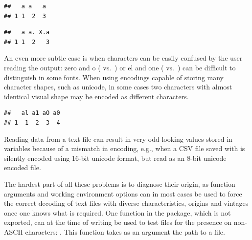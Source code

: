 \documentclass[krantz2]{krantz}\usepackage{knitr}
\begin{document}
\begin{explainbox}
\begin{knitrout}\footnotesize
{}\color{fgcolor}\begin{kframe}
\begin{alltt}
\hlstd{(} \hlstd{=} \hlstd{,}  \hlstd{=} \hlstd{,}  \hlstd{=} \hlstd{,}  \hlstd{=} \hlstd{)}
\end{alltt}
\begin{verbatim}
##   a a   a
## 1 1  2  3
\end{verbatim}
\begin{alltt}
\hlstd{(} \hlstd{=} \hlstd{,}  \hlstd{=} \hlstd{,}  \hlstd{=} \hlstd{)}
\end{alltt}
\begin{verbatim}
##   a a. X.a
## 1 1  2   3
\end{verbatim}
\end{kframe}
\end{knitrout}

An even more subtle case is when characters can be easily confused by the user reading the output: zero and o ( vs.\ ) or el and one ( vs.\ ) can be difficult to distinguish in some fonts. When using encodings capable of storing many character shapes, such as unicode, in some cases two characters with almost identical visual shape may be encoded as different characters.

\begin{knitrout}\footnotesize
{}\color{fgcolor}\begin{kframe}
\begin{alltt}
\hlstd{(} \hlstd{=} \hlstd{,}  \hlstd{=} \hlstd{,}  \hlstd{=} \hlstd{,}  \hlstd{=} \hlstd{)}
\end{alltt}
\begin{verbatim}
##   al a1 aO a0
## 1  1  2  3  4
\end{verbatim}
\end{kframe}
\end{knitrout}

Reading data from a text file can result in very odd-looking values stored in \Rlang variables because of a mismatch in encoding, e.g., when a CSV file saved with  is silently encoded using 16-bit unicode format, but read as an 8-bit unicode encoded file.

The hardest part of all these problems is to diagnose their origin, as function arguments and working environment options can in most cases be used to force the correct decoding of text files with diverse characteristics, origins and vintages once one knows what is required. One function in the \Rlang {} package, which is not exported, can at the time of writing be used to test files for the presence on non-ASCII characters: . This function takes as an argument the path to a file.
\end{explainbox}
\end{document}
